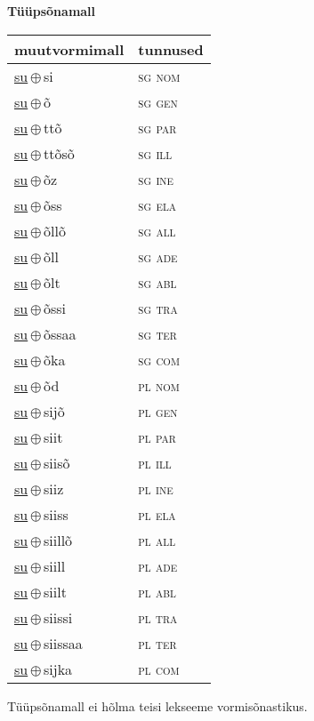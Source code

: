 

\vspace{3.5em}
\noindent \begin{minipage}{\textwidth}
\noindent \textbf{Tüüpsõnamall \,}\\

\begin{sideways}
\begin{tabular}{l l}
muutvormimall & tunnused \\
\hline
\underline{su}\,$\oplus$\,si & \textsc{ sg nom } \\
\underline{su}\,$\oplus$\,õ & \textsc{ sg gen } \\
\underline{su}\,$\oplus$\,ttõ & \textsc{ sg par } \\
\underline{su}\,$\oplus$\,ttõsõ & \textsc{ sg ill } \\
\underline{su}\,$\oplus$\,õz & \textsc{ sg ine } \\
\underline{su}\,$\oplus$\,õss & \textsc{ sg ela } \\
\underline{su}\,$\oplus$\,õllõ & \textsc{ sg all } \\
\underline{su}\,$\oplus$\,õll & \textsc{ sg ade } \\
\underline{su}\,$\oplus$\,õlt & \textsc{ sg abl } \\
\underline{su}\,$\oplus$\,õssi & \textsc{ sg tra } \\
\underline{su}\,$\oplus$\,õssaa & \textsc{ sg ter } \\
\underline{su}\,$\oplus$\,õka & \textsc{ sg com } \\
\underline{su}\,$\oplus$\,õd & \textsc{ pl nom } \\
\underline{su}\,$\oplus$\,sijõ & \textsc{ pl gen } \\
\underline{su}\,$\oplus$\,siit & \textsc{ pl par } \\
\underline{su}\,$\oplus$\,siisõ & \textsc{ pl ill } \\
\underline{su}\,$\oplus$\,siiz & \textsc{ pl ine } \\
\underline{su}\,$\oplus$\,siiss & \textsc{ pl ela } \\
\underline{su}\,$\oplus$\,siillõ & \textsc{ pl all } \\
\underline{su}\,$\oplus$\,siill & \textsc{ pl ade } \\
\underline{su}\,$\oplus$\,siilt & \textsc{ pl abl } \\
\underline{su}\,$\oplus$\,siissi & \textsc{ pl tra } \\
\underline{su}\,$\oplus$\,siissaa & \textsc{ pl ter } \\
\underline{su}\,$\oplus$\,sijka & \textsc{ pl com } \\
\end{tabular}
\end{sideways}
\label{tab:tüüpsõnamall-susi}

\end{minipage}

 
\vspace{1em}
\noindent Tüüpsõnamall  ei hõlma teisi lekseeme vormi\-sõnastikus.
